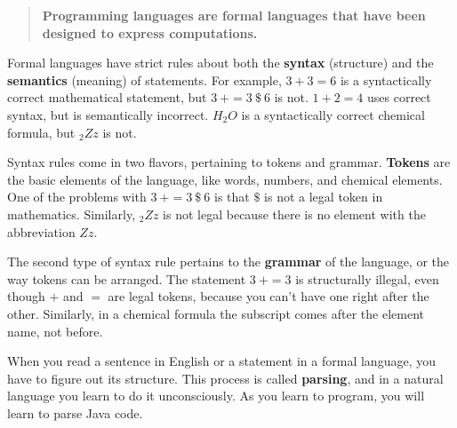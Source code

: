 \documentclass[12pt]{book}
\makeatletter
\theoremstyle{exercise}
\renewcommand\subsection{\@startsection{subsection}{2}{\z@}%
    {-3.25ex\@plus -1ex \@minus -.2ex}%
    {0.3ex \@plus .2ex}%
    {\normalfont\large\bfseries}}
\makeatother
\begin{document}

\begin{quote}
{\bf Programming languages are formal languages that have been designed to express computations.}
\end{quote}


Formal languages have strict rules about both the {\bf syntax} (structure) and the {\bf semantics} (meaning) of statements.
For example, $3 + 3 = 6$ is a syntactically correct mathematical statement, but $3\ + = 3\ \$\ 6$ is not.
$1 + 2 = 4$ uses correct syntax, but is semantically incorrect.
$H_2O$ is a syntactically correct chemical formula, but $_2Zz$ is not.



Syntax rules come in two flavors, pertaining to tokens and grammar.
{\bf Tokens} are the basic elements of the language, like words, numbers, and chemical elements.
One of the problems with $3\ + = 3\ \$\ 6$ is that $\$$ is not a legal token in mathematics.
Similarly, $_2Zz$ is not legal because there is no element with the abbreviation $Zz$.


The second type of syntax rule pertains to the {\bf grammar} of the language, or the way tokens can be arranged.
The statement $3\ + = 3$ is structurally illegal, even though $+$ and $=$ are legal tokens, because you can't have one right after the other.
Similarly, in a chemical formula the subscript comes after the element name, not before.


When you read a sentence in English or a statement in a formal language, you have to figure out its structure.
This process is called {\bf parsing}, and in a natural language you learn to do it unconsciously.
As you learn to program, you will learn to parse Java code.

\end{document}
